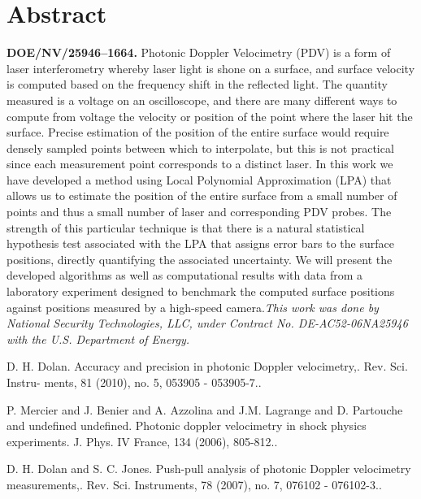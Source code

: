 \documentclass[article,A4,11pt]{llncs}%
\begin{document}
\section*{Abstract}
{\bf{DOE/NV/25946--1664.}}  Photonic Doppler Velocimetry (PDV) is a form of laser interferometry whereby laser light is shone on a surface, and surface velocity is computed based on the frequency shift in the reflected light. The quantity measured is a voltage on an oscilloscope, and there are many different ways to compute from voltage the velocity or position of the point where the laser hit the surface. Precise estimation of the position of the entire surface would require densely sampled points between which to interpolate, but this is not practical since each measurement point corresponds to a distinct laser. In this work we have developed a method using Local Polynomial Approximation (LPA) that allows us to estimate the position of the entire surface from a small number of points and thus a small number of laser and corresponding PDV probes. The strength of this particular technique is that there is a natural statistical hypothesis test associated with the LPA that assigns error bars to the surface positions, directly quantifying the associated uncertainty. We will present the developed algorithms as well as computational results with data from a laboratory experiment designed to benchmark the computed surface positions against positions measured by a high-speed camera.{\it This work was done by National Security Technologies, LLC, under Contract No. DE-AC52-06NA25946 with the U.S. Department of Energy.}


\begin{thebibliography}{10}
{\sc D. H. Dolan}. {Accuracy and precision in photonic Doppler velocimetry,}. Rev. Sci. Instru- ments, 81 (2010), no. 5, 053905 - 053905-7..

{\sc P. Mercier and J. Benier and A. Azzolina and J.M. Lagrange and D. Partouche and undefined undefined}. {Photonic doppler velocimetry in shock physics experiments}. J. Phys. IV France, 134 (2006), 805-812..

{\sc D. H. Dolan and S. C. Jones}. {Push-pull analysis of photonic Doppler velocimetry measurements,}. Rev. Sci. Instruments, 78 (2007), no. 7, 076102 - 076102-3..
\end{thebibliography}
\end{document}
